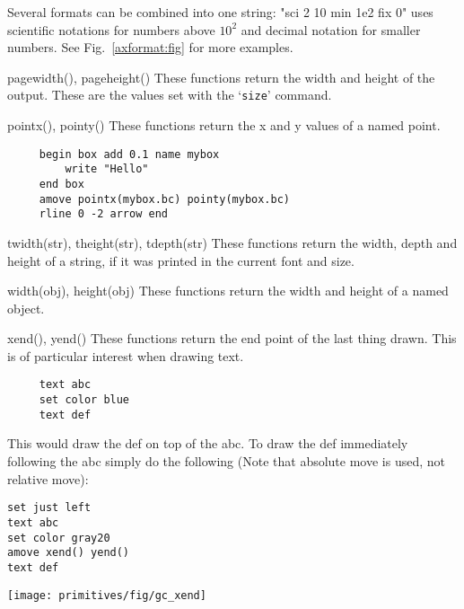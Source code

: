 \begin{commanddescription}
Several formats can be combined into one string: "sci 2 10 min 1e2 fix 0" uses scientific notations for numbers above $10^2$ and decimal notation for smaller numbers. See Fig.~\ref{axformat:fig} for more examples.

\item[{\sf pagewidth(), pageheight()}]
 
These functions return the width and height of the output. These are the values set with the `\texttt{size}' command.

\item[{\sf pointx(), pointy()}]\label{fct:pointxy}
These functions return the x and y values of a named point.

\preglecode{}
\begin{Verbatim}
     begin box add 0.1 name mybox
         write "Hello"
     end box
     amove pointx(mybox.bc) pointy(mybox.bc)
     rline 0 -2 arrow end
\end{Verbatim}
\postglecode{}

\item[{\sf twidth(str), theight(str), tdepth(str)}]
 
These functions return the width, depth and height of a string, if it was
printed in the current font and size.

\item[{\sf width(obj), height(obj)}]\label{fct:wdhi}
 
These functions return the width and height of a named object.

\item[{\sf xend(), yend()}]
 
These functions return the end point of the last thing drawn. This is
of particular interest when drawing text.

\preglecode{}
\begin{Verbatim}
     text abc
     set color blue
     text def
\end{Verbatim}
\postglecode{}

This would draw the {\sf def} on top of the {\sf abc}.  To draw the {\sf def}
immediately following the {\sf abc} simply do the following (Note that
absolute move is used, not relative move):

\begin{minipage}[c]{8cm}
\begin{Verbatim}
set just left
text abc
set color gray20 
amove xend() yend() 
text def            
\end{Verbatim}
\end{minipage}
\hfill
\begin{minipage}[c]{7cm}
\mbox{\texttt{[image: primitives/fig/gc\_xend]}}
\end{minipage}


\end{commanddescription}
